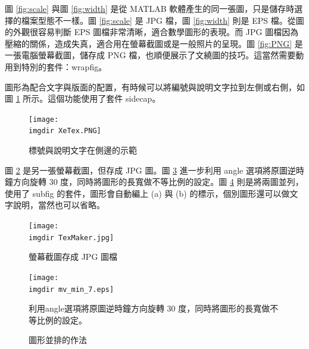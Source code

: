 \documentclass[12pt, a4paper]{article}
\begin{document}
圖 \ref{fig:scale} 與圖  \ref{fig:width} 是從 MATLAB 軟體產生的同一張圖，只是儲存時選擇的檔案型態不一樣。圖 \ref{fig:scale} 是 JPG 檔，圖  \ref{fig:width} 則是 EPS 檔。從圖的外觀很容易判斷 EPS 圖檔非常清晰，適合數學圖形的表現。而 {\C JPG} 圖檔因為壓縮的關係，造成失真，適合用在螢幕截圖或是一般照片的呈現。圖 \ref{fig:PNG} 是一張電腦螢幕截圖，儲存成 PNG 檔，也順便展示了文繞圖的技巧。這當然需要動用到特別的套件：wrapfig。

圖形為配合文字與版面的配置，有時候可以將編號與說明文字拉到左側或右側，如圖 \ref{fig:side} 所示。這個功能使用了套件 sidecap。
\begin{figure}  %
\caption{標號與說明文字在側邊的示範}
\texttt{[image: \\imgdir XeTex.PNG]}
\label{fig:side}
\end{figure}



圖 \ref{fig:JPG} 是另一張螢幕截圖，但存成 JPG 圖。圖 \ref{fig:angle} 進一步利用 angle 選項將原圖逆時鐘方向旋轉 30 度，同時將圖形的長寬做不等比例的設定。圖 \ref{fig:parallel} 則是將兩圖並列，使用了 subfig 的套件，圖形會自動編上 (a) 與 (b) 的標示，個別圖形還可以做文字說明，當然也可以省略。

\begin{figure}[h]
    \centering
        \texttt{[image: \\imgdir TexMaker.jpg]}
    \caption{螢幕截圖存成 JPG 圖檔}
    \label{fig:JPG}
\end{figure}

 

\begin{figure}[H]
    \centering
        \texttt{[image: \\imgdir mv\_min\_7.eps]}
    \caption{利用angle選項將原圖逆時鐘方向旋轉 30 度，同時將圖形的長寬做不等比例的設定。}
    \label{fig:angle}
\end{figure}

\begin{figure}[H]
    \centering
    \caption{圖形並排的作法}
    \label{fig:parallel}
\end{figure}
\end{document}
